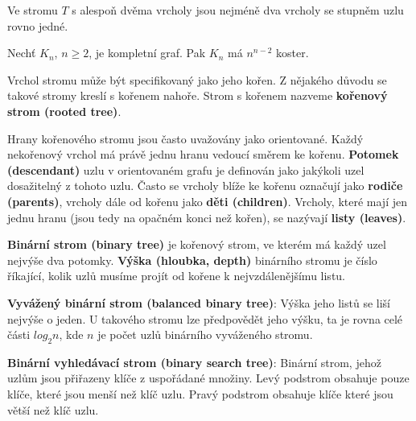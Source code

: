 \begin{theorem}
Ve stromu $T$ s alespoň dvěma vrcholy jsou nejméně dva vrcholy se stupněm uzlu rovno jedné.
\end{theorem}

\begin{theorem}[Cayley]
Nechť $K_n$, $n \geq 2$, je kompletní graf. Pak $K_n$ má $n^{n-2}$ koster.
\end{theorem}

\begin{definition}
Vrchol stromu může být specifikovaný jako jeho kořen. Z nějakého důvodu se takové stromy kreslí s kořenem nahoře. Strom s kořenem nazveme \textbf{kořenový strom (rooted tree)}.
\end{definition}

\begin{definition}
Hrany kořenového stromu jsou často uvažovány jako orientované. Každý nekořenový vrchol má právě jednu hranu vedoucí směrem ke kořenu. \textbf{Potomek (descendant)} uzlu v orientovaném grafu je definován jako jakýkoli uzel dosažitelný z tohoto uzlu. Často se vrcholy blíže ke kořenu označují jako \textbf{rodiče (parents)}, vrcholy dále od kořenu jako \textbf{děti (children)}. Vrcholy, které mají jen jednu hranu (jsou tedy na opačném konci než kořen), se nazývají \textbf{listy (leaves)}.
\end{definition}

\begin{definition}
\textbf{Binární strom (binary tree)} je kořenový strom, ve kterém má každý uzel nejvýše dva potomky. \textbf{Výška (hloubka, depth)} binárního stromu je číslo říkající, kolik uzlů musíme projít od kořene k nejvzdálenějšímu listu.
\end{definition}

\begin{definition}
\textbf{Vyvážený binární strom (balanced binary tree)}: Výška jeho listů se liší nejvýše o jeden. U takového stromu lze předpovědět jeho výšku, ta je rovna celé části $log_2 n$, kde $n$ je počet uzlů binárního vyváženého stromu.
\end{definition}

\begin{definition}
\textbf{Binární vyhledávací strom (binary search tree)}: Binární strom, jehož uzlům jsou přiřazeny klíče z uspořádané množiny. Levý podstrom obsahuje pouze klíče, které jsou menší než klíč uzlu. Pravý podstrom obsahuje klíče které jsou větší než klíč uzlu.
\end{definition}


